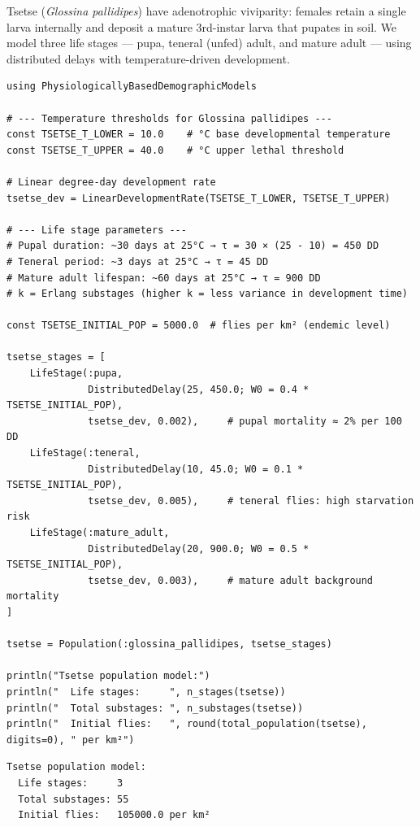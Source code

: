 \label{10974903969794258186}{}


Tsetse (\emph{Glossina pallidipes}) have adenotrophic viviparity: females retain a single larva internally and deposit a mature 3rd-instar larva that pupates in soil. We model three life stages — pupa, teneral (unfed) adult, and mature adult — using distributed delays with temperature-driven development.




\begin{verbatim}
using PhysiologicallyBasedDemographicModels

# --- Temperature thresholds for Glossina pallidipes ---
const TSETSE_T_LOWER = 10.0    # °C base developmental temperature
const TSETSE_T_UPPER = 40.0    # °C upper lethal threshold

# Linear degree-day development rate
tsetse_dev = LinearDevelopmentRate(TSETSE_T_LOWER, TSETSE_T_UPPER)

# --- Life stage parameters ---
# Pupal duration: ~30 days at 25°C → τ = 30 × (25 - 10) = 450 DD
# Teneral period: ~3 days at 25°C → τ = 45 DD
# Mature adult lifespan: ~60 days at 25°C → τ = 900 DD
# k = Erlang substages (higher k = less variance in development time)

const TSETSE_INITIAL_POP = 5000.0  # flies per km² (endemic level)

tsetse_stages = [
    LifeStage(:pupa,
              DistributedDelay(25, 450.0; W0 = 0.4 * TSETSE_INITIAL_POP),
              tsetse_dev, 0.002),     # pupal mortality ≈ 2% per 100 DD
    LifeStage(:teneral,
              DistributedDelay(10, 45.0; W0 = 0.1 * TSETSE_INITIAL_POP),
              tsetse_dev, 0.005),     # teneral flies: high starvation risk
    LifeStage(:mature_adult,
              DistributedDelay(20, 900.0; W0 = 0.5 * TSETSE_INITIAL_POP),
              tsetse_dev, 0.003),     # mature adult background mortality
]

tsetse = Population(:glossina_pallidipes, tsetse_stages)

println("Tsetse population model:")
println("  Life stages:     ", n_stages(tsetse))
println("  Total substages: ", n_substages(tsetse))
println("  Initial flies:   ", round(total_population(tsetse), digits=0), " per km²")
\end{verbatim}




\begin{verbatim}
Tsetse population model:
  Life stages:     3
  Total substages: 55
  Initial flies:   105000.0 per km²
\end{verbatim}



